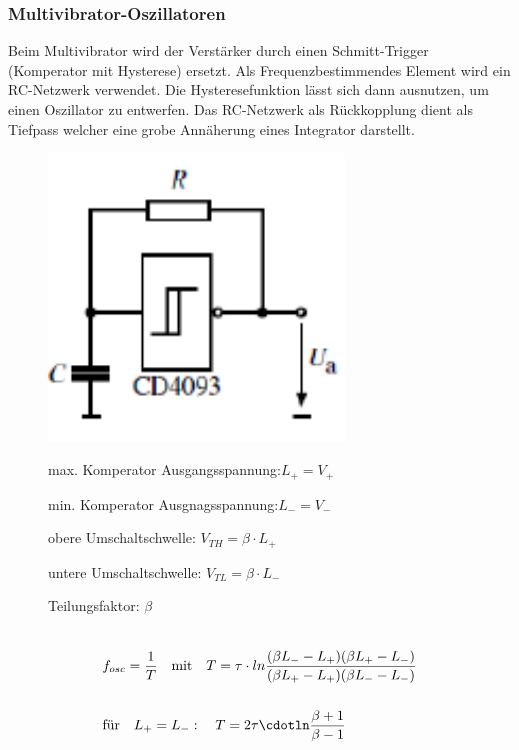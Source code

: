 \subsubsection{Multivibrator-Oszillatoren}
Beim Multivibrator wird der Verstärker durch einen Schmitt-Trigger (Komperator mit Hysterese) ersetzt. Als Frequenzbestimmendes Element wird ein RC-Netzwerk verwendet. Die Hysteresefunktion lässt sich dann ausnutzen, um einen Oszillator zu entwerfen. Das RC-Netzwerk als Rückkopplung dient als Tiefpass welcher eine grobe Annäherung eines Integrator darstellt.
\begin{figure}[h!]
	\begin{minipage}{0.3\textwidth} 
	\includegraphics[width=0.7\textwidth]{images/Multivibrator_Komp}
	\end{minipage}
	\begin{minipage}{0.6\textwidth}
      \begin{compactitem}
        \item max. Komperator Ausgangsspannung:\quad $L_+=V_+$
        \item min. Komperator Ausgnagsspannung:\quad $L_-=V_-$
        \item obere Umschaltschwelle: \quad $V_{TH}=\beta\cdot L_+$
        \item untere Umschaltschwelle: \quad $V_{TL}=\beta\cdot L_-$
        \item Teilungsfaktor: $\beta$\\\\
       \end{compactitem}
      \begin{equation*} 
        \begin{split} 
          &f_{osc}=\frac{1}{T} \quad \text{mit} \quad T=\tau \cdot ln \frac{(\beta L_- - L_+)(\beta L_+ - L_-)}{(\beta L_+ - L_+)(\beta L_- - L_-)}\\\\
          & \text{für} \quad   L_+=L_-: \quad  T=2\tau \cdotln\frac{\beta+1}{\beta-1}\\\\
        \end{split} 
      \end{equation*}
	\end{minipage}
\end{figure}


